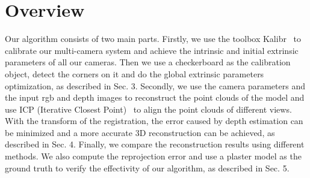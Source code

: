 \section{Overview}
Our algorithm consists of two main parts. Firstly, we use the toolbox Kalibr~\cite{Maye2013Self} to calibrate our multi-camera system and achieve the intrinsic and initial extrinsic parameters of all our cameras. Then we use a checkerboard as the calibration object, detect the corners on it and do the global extrinsic parameters optimization, as described in Sec. 3. Secondly, we use the camera parameters and the input rgb and depth images to reconstruct the point clouds of the model and use ICP (Iterative Closest Point)~\cite{Besl1992A} to align the point clouds of different views. With the transform of the registration, the error caused by depth estimation can be minimized and a more accurate 3D reconstruction can be achieved, as described in Sec. 4. Finally, we compare the reconstruction results using different methods. We also compute the reprojection error and use a plaster model as the ground truth to verify the effectivity of our algorithm, as described in Sec. 5.
